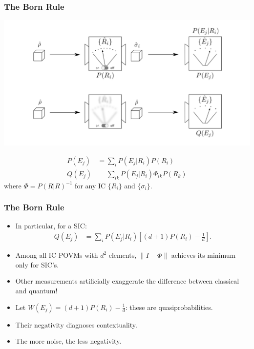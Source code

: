\documentclass{beamer}
\begin{document}
\begin{frame}
\frametitle{The Born Rule}
\vspace{-2em}
\begin{center}
\includegraphics[scale=0.45]{img/sky_ground}	
\end{center}
\vspace{-2em}
\begin{small}
\begin{align}
P(E_j) &= \sum_i P(E_j|R_i)P(R_i)\\
Q(E_j) &= \sum_{ik} P(E_j|R_i)\Phi_{ik}P(R_k)
\end{align}
where $\Phi = P(R|R)^{-1}$ for any IC $\{R_i\}$ and $\{\sigma_i\}$.\end{small}
\end{frame}

\begin{frame}
\frametitle{The Born Rule}
\begin{itemize}
\item In particular, for a SIC:
\begin{align}
Q(E_j) &=\sum_{i} P(E_j|R_i)\left[(d+1)P(R_i)-\frac{1}{d}\right]	.
\end{align}	
\item Among all IC-POVMs with $d^2$ elements, $\lVert I - \Phi \rVert$ achieves its minimum only for SIC's.
\item Other measurements artificially exaggerate the difference between classical and quantum!
\item  Let $W(E_j)=(d+1)P(R_i)-\frac{1}{d}$: these are quasiprobabilities. 
\item Their negativity diagnoses contextuality. 
\item The more noise, the less negativity.
\end{itemize}
	
\end{frame}
\end{document}
